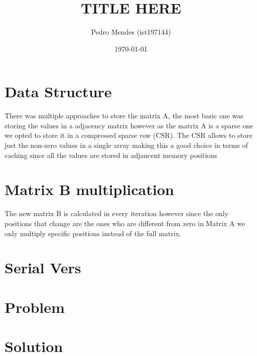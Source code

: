 \documentclass[a4paper]{article}
\begin{document}
\title{TITLE HERE} %
\author{Pedro Mendes (ist197144)}
\date{\today}
\maketitle

\section{Data Structure}
There was multiple approaches to store the matrix A, the most basic one was storing the values in a adjacency matrix however as the matrix A is a sparse one we opted to store it in a compressed sparse row (CSR). The CSR allows to store just the non-zero values in a single array making this a good choice in terms of caching since all the values are stored in adjancent memory positions

\section{Matrix B multiplication}
The new matrix B is calculated in every iteration however since the only positions that change are the ones who are different from zero in Matrix A we only multiply specific positions instead of the full matrix.
\section{Serial Vers}

\section{Problem}

\section{Solution}
\end{document}
